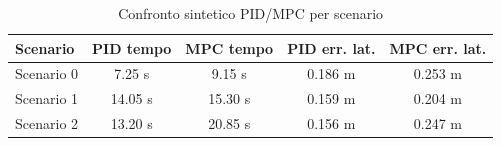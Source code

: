 \begin{table}[H]
    \centering
    \caption{Confronto sintetico PID/MPC per scenario}
    \begin{tabular}{lcccc}
        \toprule
        \textbf{Scenario} & \textbf{PID tempo} & \textbf{MPC tempo} & \textbf{PID err. lat.} & \textbf{MPC err. lat.} \\
        \midrule
        Scenario 0 & 7.25 s & 9.15 s & 0.186 m & 0.253 m \\
        Scenario 1 & 14.05 s & 15.30 s & 0.159 m & 0.204 m \\
        Scenario 2 & 13.20 s & 20.85 s & 0.156 m & 0.247 m \\
        \bottomrule
    \end{tabular}
\end{table}
